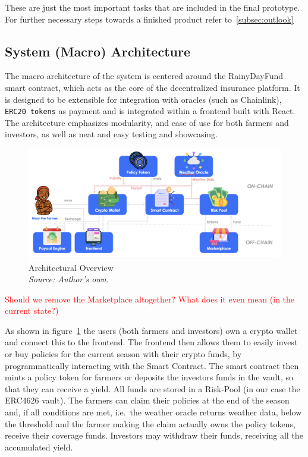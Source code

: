 \documentclass[11pt,a4paper]{article}
\begin{document}
    These are just the most important tasks that are included in the final prototype. For further necessary steps towards a finished product refer to~\ref{subsec:outlook}

    \subsection{System (Macro) Architecture}\label{subsec:system-architecture}
    The macro architecture of the system is centered around the RainyDayFund smart contract, which acts as the core of the decentralized insurance platform.
    It is designed to be extensible for integration with oracles (such as Chainlink), \texttt{ERC20 tokens} as payment and is integrated within a frontend built with React.
    The architecture emphasizes modularity, and ease of use for both farmers and investors, as well as neat and easy testing and showcasing.

    \begin{figure}[H]
        \centering
        \includegraphics[scale=0.5]{graphics/Architectural_Overview}
        \caption{Architectural Overview \\ \textit{Source: Author's own.}}
        \label{fig:architecture}
    \end{figure}
    \textcolor{red}{Should we remove the Marketplace altogether? What does it even mean (in the current state?)}

    As shown in figure~\ref{fig:architecture} the users (both farmers and investors) own a crypto wallet and connect this to the frontend.
    The frontend then allows them to easily invest or buy policies for the current season with their crypto funds, by programmatically interacting with the Smart Contract.
    The smart contract then mints a policy token for farmers or deposits the investors funds in the vault, so that they can receive a yield.
    All funds are stored in a Risk-Pool (in our case the ERC4626 vault).
    The farmers can claim their policies at the end of the season and, if all conditions are met, i.e.\ the weather oracle returns weather data, below the threshold and the farmer making the claim actually owns the policy tokens, receive their coverage funds.
    Investors may withdraw their funds, receiving all the accumulated yield.
\end{document}

